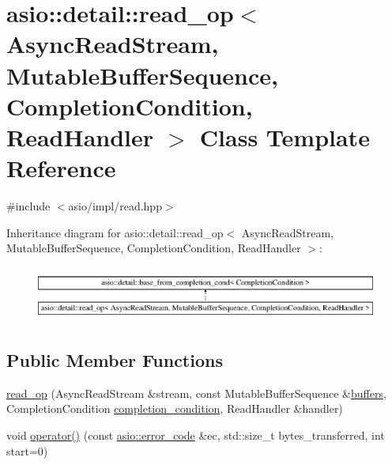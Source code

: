 \hypertarget{classasio_1_1detail_1_1read__op}{}\section{asio\+:\+:detail\+:\+:read\+\_\+op$<$ Async\+Read\+Stream, Mutable\+Buffer\+Sequence, Completion\+Condition, Read\+Handler $>$ Class Template Reference}
\label{classasio_1_1detail_1_1read__op}


{\ttfamily \#include $<$asio/impl/read.\+hpp$>$}

Inheritance diagram for asio\+:\+:detail\+:\+:read\+\_\+op$<$ Async\+Read\+Stream, Mutable\+Buffer\+Sequence, Completion\+Condition, Read\+Handler $>$\+:\begin{figure}[H]
\begin{center}
\leavevmode
\includegraphics[height=1.830065cm]{classasio_1_1detail_1_1read__op}
\end{center}
\end{figure}
\subsection*{Public Member Functions}
\begin{DoxyCompactItemize}
\item 
\hyperlink{classasio_1_1detail_1_1read__op_ac145e93f691e7eed0379ac75e87b9d33}{read\+\_\+op} (Async\+Read\+Stream \&stream, const Mutable\+Buffer\+Sequence \&\hyperlink{group__async__read_ga54dede45c3175148a77fe6635222c47d}{buffers}, Completion\+Condition \hyperlink{group__async__read_gae2e215d5013596cc2b385bb6c13fa518}{completion\+\_\+condition}, Read\+Handler \&handler)
\item 
void \hyperlink{classasio_1_1detail_1_1read__op_a1c66ba50081c1767641da3accd757b3b}{operator()} (const \hyperlink{classasio_1_1error__code}{asio\+::error\+\_\+code} \&ec, std\+::size\+\_\+t bytes\+\_\+transferred, int start=0)
\end{DoxyCompactItemize}
